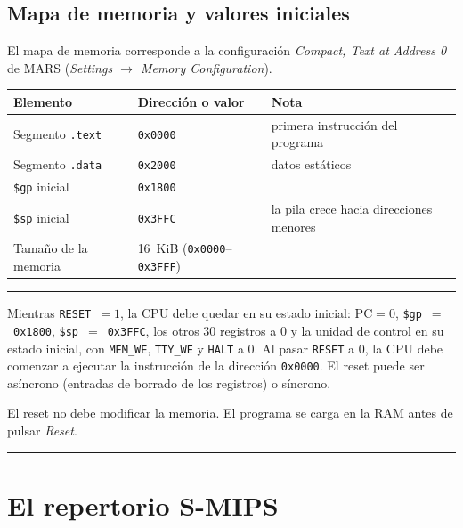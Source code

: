 \documentclass[11pt,a4paper]{article}
\newcommand{\sig}[1]{\texttt{#1}}
\newcommand{\req}[1]{\textbf{[#1]}}
\newenvironment{obligatorio}{\begin{center}\begin{minipage}{0.95\linewidth}\hrule\smallskip}{\smallskip\hrule\end{minipage}\end{center}}
\begin{document}
\subsection{Mapa de memoria y valores iniciales}

El mapa de memoria corresponde a la configuración \emph{Compact, Text at Address 0} de MARS (\emph{Settings $\to$ Memory Configuration}).

\begin{center}
\begin{tabular}{@{}lll@{}}
\toprule
Elemento & Dirección o valor & Nota \\
\midrule
Segmento \sig{.text} & \sig{0x0000} & primera instrucción del programa \\
Segmento \sig{.data} & \sig{0x2000} & datos estáticos \\
\sig{\$gp} inicial & \sig{0x1800} & \\
\sig{\$sp} inicial & \sig{0x3FFC} & la pila crece hacia direcciones menores \\
Tamaño de la memoria & 16~KiB (\sig{0x0000}--\sig{0x3FFF}) & \\
\bottomrule
\end{tabular}
\end{center}

\begin{obligatorio}
\begin{description}[leftmargin=1.2cm,style=nextline]
\item[\req{R6}] Mientras \sig{RESET}~$=1$, la CPU debe quedar en su estado inicial: $\mathrm{PC}=0$, \sig{\$gp}~$=$~\sig{0x1800}, \sig{\$sp}~$=$~\sig{0x3FFC}, los otros 30 registros a 0 y la unidad de control en su estado inicial, con \sig{MEM\_WE}, \sig{TTY\_WE} y \sig{HALT} a 0. Al pasar \sig{RESET} a 0, la CPU debe comenzar a ejecutar la instrucción de la dirección \sig{0x0000}. El reset puede ser asíncrono (entradas de borrado de los registros) o síncrono.
\item[\req{R7}] El reset no debe modificar la memoria. El programa se carga en la RAM antes de pulsar \emph{Reset}.
\end{description}
\end{obligatorio}

\section{El repertorio S-MIPS}\label{sec:isa}
\end{document}
